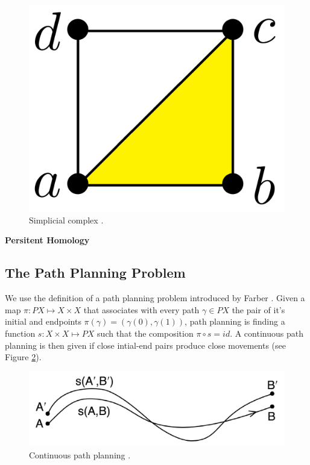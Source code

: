 \documentclass[]{article}
\begin{document}
\begin{figure}[h] \centering \includegraphics[scale=.10]{simplicialcomplex}
  \caption{Simplicial complex \cite{otterRoadmapComputationPersistent2017}.}
  \label{fig:simplicialcomplex}
\end{figure}

\textbf{Persitent Homology}

\subsection*{The Path Planning Problem} We use the definition of a
path planning problem introduced by Farber
\cite{farberTopologicalComplexityMotion2003}. Given a map \(\pi: PX
\mapsto X \times X\) that associates with every path \(\gamma \in PX\)
the pair of it's initial and endpoints \(\pi(\gamma) = (\gamma(0),
\gamma(1))\), path planning is finding a function \(s: X \times X
\mapsto PX\) such that the composition \(\pi \circ s = id\). A
continuous path planning is then given if close intial-end pairs
produce close movements (see Figure \ref{fig:continuouspathplanning}).

\begin{figure}[h]
  \centering
  \includegraphics[scale=.3]{continuouspathplanning}
  \caption{Continuous path planning \cite{farberTopologicalComplexityMotion2003}.}
  \label{fig:continuouspathplanning}
\end{figure}
\end{document}
